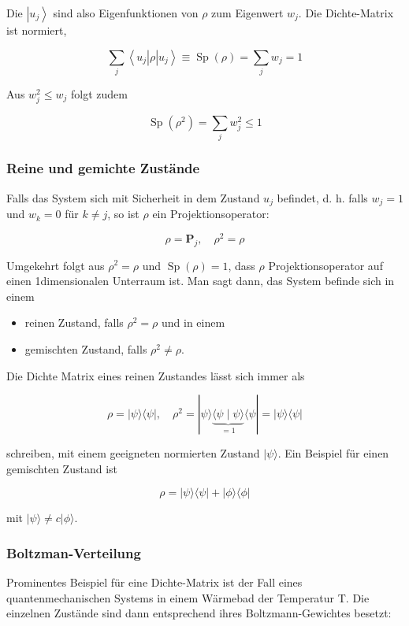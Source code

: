\documentclass[10pt, letterpaper]{article}
\begin{document}
Die $\left|u_{j}\right\rangle$ sind also Eigenfunktionen von $\rho$ zum Eigenwert $w_{j}$. Die Dichte-Matrix ist normiert,

$$
\sum_{j}\left\langle u_{j}\right| \rho\left|u_{j}\right\rangle \equiv \operatorname{Sp}(\rho)=\sum_{j} w_{j}=1
$$

Aus $w_{j}^{2} \leq w_{j}$ folgt zudem

$$
\operatorname{Sp}\left(\rho^{2}\right)=\sum_{j} w_{j}^{2} \leq 1
$$

\subsubsection*{Reine und gemichte Zustände}
Falls das System sich mit Sicherheit in dem Zustand $u_{j}$ befindet, d. h. falls $w_{j}=1$ und $w_{k}=0$ für $k \neq j$, so ist $\rho$ ein Projektionsoperator:

$$
\rho=\mathbf{P}_{j}, \quad \rho^{2}=\rho
$$

Umgekehrt folgt aus $\rho^{2}=\rho$ und $\operatorname{Sp}(\rho)=1$, dass $\rho$ Projektionsoperator auf einen 1dimensionalen Unterraum ist. Man sagt dann, das System befinde sich in einem

\begin{itemize}
  \item reinen Zustand, falls $\rho^{2}=\rho$ und in einem
  \item gemischten Zustand, falls $\rho^{2} \neq \rho$.
\end{itemize}

Die Dichte Matrix eines reinen Zustandes lässt sich immer als

$$
\rho=|\psi\rangle\langle\psi|, \quad \rho^{2}=|\psi\rangle \underbrace{\langle\psi \mid \psi\rangle}_{=1}\langle\psi|=|\psi\rangle\langle\psi|
$$

schreiben, mit einem geeigneten normierten Zustand $|\psi\rangle$. Ein Beispiel für einen gemischten Zustand ist

$$
\rho=|\psi\rangle\langle\psi|+|\phi\rangle\langle\phi|
$$

mit $|\psi\rangle \neq c|\phi\rangle$.

\subsubsection*{Boltzman-Verteilung}
Prominentes Beispiel für eine Dichte-Matrix ist der Fall eines quantenmechanischen Systems in einem Wärmebad der Temperatur T. Die einzelnen Zustände sind dann entsprechend ihres Boltzmann-Gewichtes besetzt:
\end{document}
